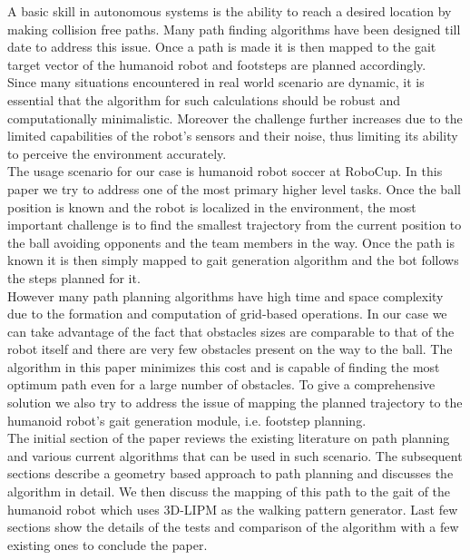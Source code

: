 \documentclass[letterpaper, 10 pt, conference]{ieeeconf}  %
\begin{document}
A basic skill in autonomous systems is the ability to reach a desired location by making collision free paths. Many path finding algorithms have been designed till date to address this issue. Once a path is made it is then mapped to the gait target vector of the humanoid robot and footsteps are planned accordingly. \\
Since many situations encountered in real world scenario are dynamic, it is essential that the algorithm for such calculations should be robust and computationally minimalistic. Moreover the challenge further increases due to the limited capabilities of the robot's sensors and their noise, thus limiting its ability to perceive the environment accurately.\\
The usage scenario for our case is humanoid robot soccer at RoboCup. In this paper we try to address one of the most primary higher level tasks. Once the ball position is known and the robot is localized in the environment, the most important challenge is to find the smallest trajectory from the current position to the ball avoiding opponents and the team members in the way. Once the path is known it is then simply mapped to gait generation algorithm and the bot follows the steps planned for it.\\
However many path planning algorithms have high time and space complexity due to the formation and computation of grid-based operations. In our case we can take advantage of the fact that obstacles sizes are comparable to that of the robot itself and there are very few obstacles present on the way to the ball. The algorithm in this paper minimizes this cost and is capable of finding the most optimum path even for a large number of obstacles. To give a comprehensive solution we also try to address the issue of mapping the planned trajectory to the humanoid robot's gait generation module, i.e. footstep planning.\\
The initial section of the paper reviews the existing literature on path planning and various current algorithms that can be used in such scenario. The subsequent sections describe a geometry based approach to path planning and discusses the algorithm in detail. We then discuss the mapping of this path to the gait of the humanoid robot which uses 3D-LIPM as the walking pattern generator. Last few sections show the details of the tests and comparison of the algorithm with a few existing ones to conclude the paper.
\end{document}

